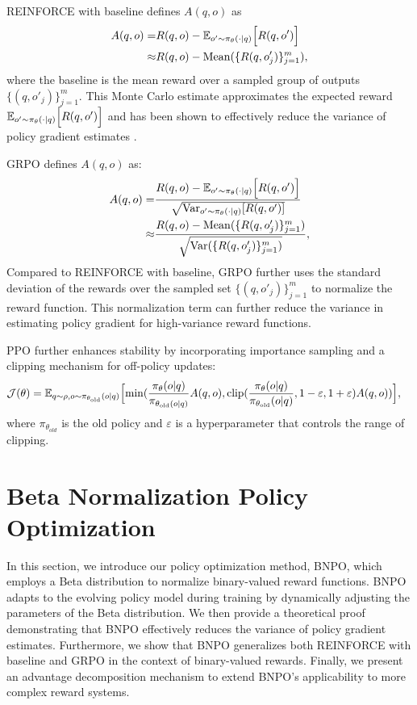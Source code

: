 \documentclass{article}
\theoremstyle{plain}
\theoremstyle{definition}
\theoremstyle{remark}
\begin{document}
REINFORCE with baseline \citep{team2025kimi,kool2019buy} defines $A(q,o)$ as
\begin{align}
\label{equation:5}
    A(q,o)=&R(q,o) - \mathbb{E}_{o'\sim\pi_\theta(\cdot| q)}\Bigl[ R(q,o') \Bigr]\notag\\
    \approx &R(q,o) - \mathrm{Mean}(\{R(q,o'_{j})\}_{j=1}^{m}),
\end{align}
where the baseline is the mean reward over a sampled group of outputs $\{(q, o'_j)\}_{j=1}^m$. This Monte Carlo estimate approximates the expected reward $\mathbb{E}_{o'\sim\pi_\theta(\cdot| q)}\Bigl[ R(q,o') \Bigr]$ and has been shown to effectively reduce the variance of policy gradient estimates \citep{wu2018variance}.

GRPO  \citep{guo2025deepseek,shao2024deepseekmath} defines $A(q,o)$ as:
\begin{align}
\label{equation:6}
    A(q,o)
     =&\frac{R(q,o)-\mathbb{E}_{o'\sim\pi_\theta(\cdot| q)}\Bigl[ R(q,o') \Bigr]}{\sqrt{\mathrm{Var}_{o'\sim\pi_\theta(\cdot| q)}[R(q,o')]}}\notag\\
    \approx &\frac{R(q,o) - \mathrm{Mean}(\{R(q,o'_{j})\}_{j=1}^{m})}{\sqrt{\mathrm{Var}(\{R(q,o'_{j})\}_{j=1}^{m})}},
\end{align}
Compared to REINFORCE with baseline, GRPO further uses the standard deviation of the rewards over the sampled set $\{(q, o'_j)\}_{j=1}^m$ to normalize the reward function. This normalization term can further reduce the variance in estimating policy gradient for high-variance reward functions.

PPO \citep{schulman2017proximal} further enhances stability by incorporating importance sampling and a clipping mechanism for off-policy updates:
\begin{align}
\label{equation:7}
    &\mathcal{J}(\theta)=\mathbb{E}_{q\sim \rho,o\sim \pi_{\theta_{\text{old}}}(o|q)}\Bigl[\min (\frac{\pi_{\theta}(o|q)}{\pi_{\theta_{\text{old}}(o|q)}}A(q,o),\text{clip}(\frac{\pi_{\theta}(o|q)}{\pi_{\theta_{\text{old}}}(o|q)},1-\varepsilon,1+\varepsilon)A(q,o))\Bigl],
\end{align}
where $\pi_{\theta_{old}}$ is the old policy and $\varepsilon$ is a hyperparameter that controls the range of clipping.


\section{Beta Normalization Policy Optimization}
In this section, we introduce our policy optimization method, BNPO, which employs a Beta distribution to normalize binary-valued reward functions. BNPO adapts to the evolving policy model during training by dynamically adjusting the parameters of the Beta distribution. We then provide a theoretical proof demonstrating that BNPO effectively reduces the variance of policy gradient estimates. Furthermore, we show that BNPO generalizes both REINFORCE with baseline and GRPO in the context of binary-valued rewards. Finally, we present an advantage decomposition mechanism to extend BNPO's applicability to more complex reward systems.
\end{document}
